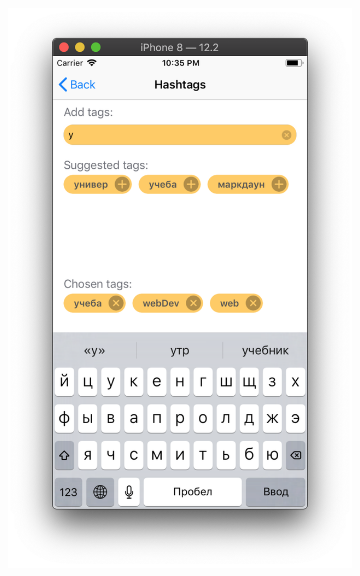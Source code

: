 \documentclass[a4paper,12pt]{article}
\begin{document}
\begin{figure}[h!]
\begin{subfigure}[b]{0.3\linewidth}
			\includegraphics[width=\linewidth]{../includes/pmi/choose_hashtag.png}
		\end{subfigure}
		\begin{subfigure}[b]{0.3\linewidth}

\end{subfigure}
\end{figure}
\end{document}
